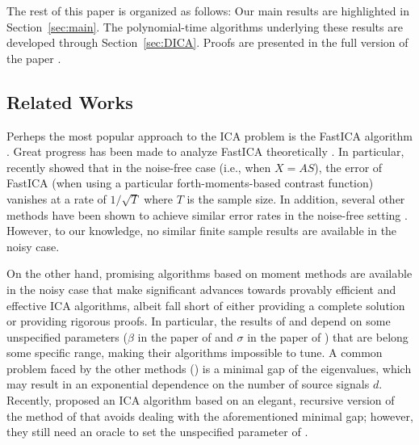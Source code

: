 \documentclass{article} %
\theoremstyle{definition}
\begin{document}
The rest of this paper is organized as follows: 
Our main results are highlighted in Section~\ref{sec:main}.
The polynomial-time algorithms underlying these results are developed through Section~\ref{sec:DICA}.
Proofs are presented in the full version of the paper \citep{HuGySz15}.

\subsection{Related Works}
Perheps the most popular approach to the ICA problem is the FastICA algorithm \citep{hyvarinen1999fast}. 
Great progress has been made to analyze FastICA theoretically \citep{tichavsky2006performance,oja2006fastica,ollila2010deflation,dermoune2013fastica,wei2014convergence}.
In particular, recently \citet{miettinen2014fourth} showed that in the noise-free case (i.e., when $X = AS$), the error of FastICA (when using a particular forth-moments-based contrast function) vanishes at a rate of $1/\sqrt{T}$ where $T$ is the sample size.
In addition, several other methods have been shown to achieve similar error rates in the noise-free setting \citep[e.g.,][]{eriksson2003characteristic,samarov2004nonparametric,chen2005consistent,chen2006efficient}.
However, to our knowledge, no similar finite sample results are available in the noisy case.

On the other hand, promising algorithms based on moment methods are available in the noisy case that make significant advances towards provably efficient and effective ICA algorithms, albeit fall short of either providing a complete solution or providing rigorous proofs. \citep{anandkumar2012tensordecomposition,anandkumar2012method, arora2012provable, hsu2013learning, goyal2014fourier}
In particular, the results of \citep{arora2012provable} and \cite{goyal2014fourier} depend on some  unspecified parameters ($\beta$ in the paper of \citep{arora2012provable} and $\sigma$ in the paper of \citep{goyal2014fourier}) that are belong some specific range, making their algorithms impossible to tune.
A common problem faced by the other methods (\citep{anandkumar2012tensordecomposition,anandkumar2012method,hsu2013learning}) is a minimal gap of the eigenvalues, which may result in an exponential dependence on the number of source signals $d$. 
Recently, \citet{vempala2014max} proposed an ICA algorithm based on an elegant, recursive version of the method of \citet{goyal2014fourier} that avoids dealing with the aforementioned minimal gap; however, they still need an oracle to set the unspecified parameter of \citet{goyal2014fourier}.
\end{document}
